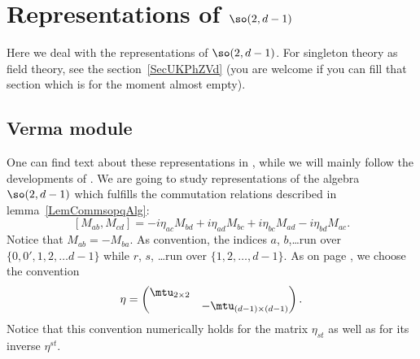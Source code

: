 \section{Representations of \texorpdfstring{$\so(2,d-1)$}{so2d}}

Here we deal with the representations of \( \so(2,d-1)\). For singleton theory as field theory, see the section~\ref{SecUKPhZVd} (you are welcome if you can fill that section which is for the moment almost empty).

\subsection{Verma module}

One can find text about these representations in \cite{Ferrata,Dolan_son,SingString}, while we will mainly follow the developments of \cite{SingletonCompposites,HowMassless,Teschner}. We are going to study representations of the algebra $\so(2,d-1)$ which fulfills the commutation relations described in lemma~\ref{LemCommsopqAlg}:
\begin{equation}		\label{EqCommsodeuxdmoinsun}
	[M_{ab},M_{cd}]=-i\eta_{ac}M_{bd}+i\eta_{ad}M_{bc}+i\eta_{bc}M_{ad}-i\eta_{bd}M_{ac}.
\end{equation}
Notice that $M_{ab}=-M_{ba}$. As convention, the indices $a$, $b$,\ldots run over $\{ 0,0',1,2,\ldots d-1 \}$ while $r$, $s$, \ldots run over $\{ 1,2,\ldots,d-1 \}$. As on page \pageref{PgDefsGenre}, we choose the convention
\begin{equation}
	\eta =
	\begin{pmatrix}
		\mtu_{2\times 2}\\
		&-\mtu_{(d-1)\times (d-1)}
	\end{pmatrix}.
\end{equation}
Notice that this convention numerically holds for the matrix $\eta_{st}$ as well as for its inverse $\eta^{st}$.

